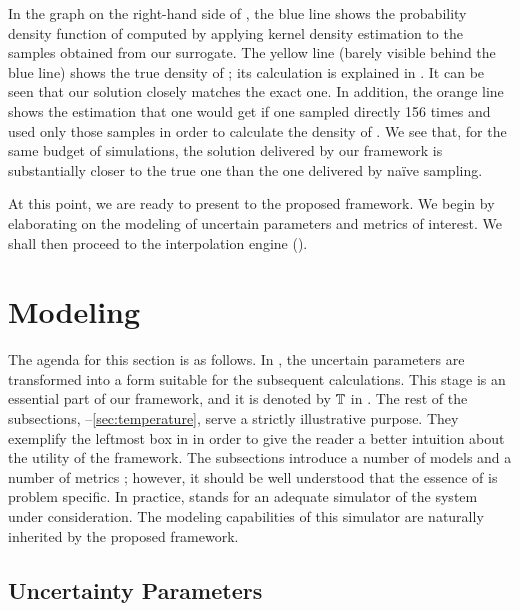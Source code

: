 In the graph on the right-hand side of , the blue line shows the
probability density function of \g computed by applying kernel density
estimation to the samples obtained from our surrogate. The yellow line (barely
visible behind the blue line) shows the true density of \g; its calculation is
explained in . It can be seen that our solution closely
matches the exact one. In addition, the orange line shows the estimation that
one would get if one sampled \g directly 156 times and used only those samples
in order to calculate the density of \g. We see that, for the same budget of
simulations, the solution delivered by our framework is substantially closer to
the true one than the one delivered by na\"{i}ve sampling.

At this point, we are ready to present to the proposed framework. We begin by
elaborating on the modeling of uncertain parameters and metrics of interest. We
shall then proceed to the interpolation engine ().

\section{Modeling}

The agenda for this section is as follows. In , the uncertain
parameters \vu are transformed into a form suitable for the subsequent
calculations. This stage is an essential part of our framework, and it is
denoted by $\transform$ in . The rest of the subsections,
--\ref{sec:temperature}, serve a strictly illustrative purpose. They
exemplify the leftmost box in  in order to give the reader a
better intuition about the utility of the framework. The subsections introduce a
number of models and a number of metrics \g; however, it should be well
understood that the essence of \g is problem specific. In practice, \g stands
for an adequate simulator of the system under consideration. The modeling
capabilities of this simulator are naturally inherited by the proposed
framework.

\subsection{Uncertainty Parameters}

